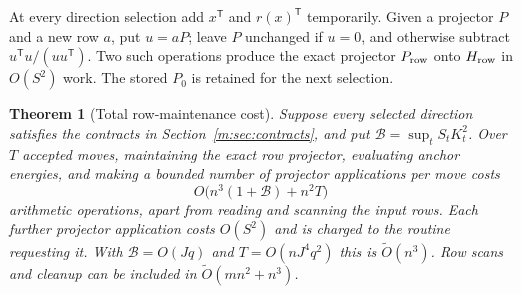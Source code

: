 \documentclass[11pt]{amsart}
\newtheorem{theorem}{Theorem}[section]
\theoremstyle{definition}\newtheorem{definition}[theorem]{Definition}
\theoremstyle{remark}\newtheorem{remark}[theorem]{Remark}
\numberwithin{equation}{section}
\begin{document}
At every direction selection add $x^{\mathsf T}$ and
$r(x)^{\mathsf T}$ temporarily. Given a projector $P$ and a new row $a$,
put $u=aP$; leave $P$ unchanged if $u=0$, and otherwise subtract
$u^{\mathsf T}u/(uu^{\mathsf T})$. Two such operations produce the exact
projector $P_{\rm row}$ onto $H_{\rm row}$ in $O(S^2)$ work. The stored
$P_0$ is retained for the next selection.

\begin{theorem}[Total row-maintenance cost]\label{m:thm:rowcost}
Suppose every selected direction satisfies the contracts in
Section~\ref{m:sec:contracts}, and put
$\mathcal B=\sup_t S_tK_t^2$. Over $T$ accepted moves, maintaining the exact row projector, evaluating
anchor energies, and making a bounded number of projector applications
per move costs
\[
 O\bigl(n^3(1+\mathcal B)+n^2T\bigr)
\]
arithmetic operations, apart from reading and scanning the input rows.
Each further projector application costs $O(S^2)$ and is charged to the
routine requesting it. With $\mathcal B=O(Jq)$ and $T=O(nJ^4q^2)$ this is
$\widetilde O(n^3)$. Row scans and cleanup can be included in
$\widetilde O(mn^2+n^3)$.
\end{theorem}
\end{document}
